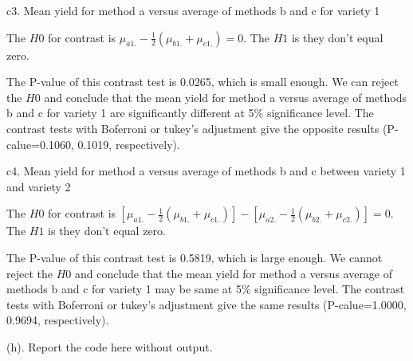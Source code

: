 \documentclass[]{article}
\begin{document}
c3. Mean yield for method a versus average of methods b and c for
variety 1

The \(H0\) for contrast is \(\mu_{a1.}-\frac12(\mu_{b1.}+\mu_{c1.})=0\).
The \(H1\) is they don't equal zero.

The P-value of this contrast test is 0.0265, which is small enough. We
can reject the \(H0\) and conclude that the mean yield for method a
versus average of methods b and c for variety 1 are significantly
different at 5\% significance level. The contrast tests with Boferroni
or tukey's adjustment give the opposite results (P-calue=0.1060, 0.1019,
respectively).

c4. Mean yield for method a versus average of methods b and c between
variety 1 and variety 2

The \(H0\) for contrast is
\([\mu_{a1.}-\frac12(\mu_{b1.}+\mu_{c1.})]-[\mu_{a2.}-\frac12(\mu_{b2.}+\mu_{c2.})]=0\).
The \(H1\) is they don't equal zero.

The P-value of this contrast test is 0.5819, which is large enough. We
cannot reject the \(H0\) and conclude that the mean yield for method a
versus average of methods b and c for variety 1 may be same at 5\%
significance level. The contrast tests with Boferroni or tukey's
adjustment give the same results (P-calue=1.0000, 0.9694, respectively).

(h). \textcolor[rgb]{0.5,0.5,0.5}{Report the code here without output.}
\end{document}

